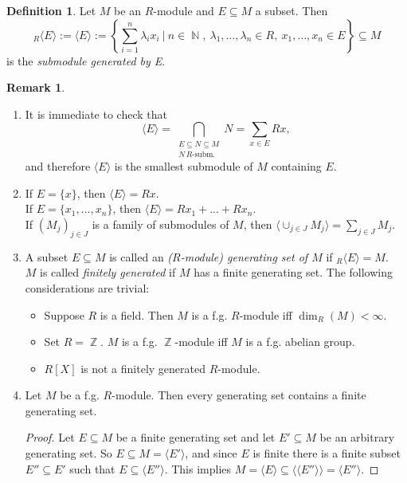 \documentclass[12pt,a4paper]{report}
\theoremstyle{definition}
\newtheorem{defn}[theorem]{Definition}
\newtheorem*{remark}{Remark}
\theoremstyle{num.custom-title}
\DeclareMathOperator{\N}{\mathbb{N}}
\DeclareMathOperator{\Z}{\mathbb{Z}}
\DeclareMathOperator{\sse}{\subseteq}
\begin{document}
\begin{defn}
Let $M$ be an $R$-module and $E \sse M$ a subset. Then 
\[
{}_R \langle E \rangle := \langle E \rangle := \left\{ \sum_{i=1}^n \lambda_i x_i \ \Bigg| \ n \in \N, \ \lambda_1, \ldots, \lambda_n \in R, \ x_1, \ldots, x_n \in E \right\} \sse M
\]
is the \emph{submodule generated by E}.
\end{defn}

\begin{remark}\ 
\begin{enumerate}
\item It is immediate to check that 
\[
\langle E \rangle = \bigcap_{\substack{E \sse N \sse M \\ N \, \text{$R$-subm.}}} N = \sum_{x \in E} Rx,
\]
and therefore $\langle E \rangle$ is the smallest submodule of $M$ containing $E$.
\item If $E = \{x\}$, then $\langle E \rangle = Rx$.\\ 
If $E = \{x_1,...,x_n\}$, then $\langle E \rangle = Rx_1 + ... + Rx_n$.\\
If $(M_j)_{j \in J}$ is a family of submodules of $M$, then $\langle \cup_{j \in J} M_j \rangle = \sum_{j \in J} M_j$.
\item A subset $E \sse M$ is called an \emph{($R$-module) generating set of $M$} if ${}_R \langle E \rangle = M$.\\
$M$ is called \emph{finitely generated} if $M$ has a finite generating set. The following considerations are trivial:
\begin{itemize}
\item Suppose $R$ is a field. Then $M$ is a f.g. $R$-module iff $\dim_R(M) < \infty$.
\item Set $R=\Z$. $M$ is a f.g. $\Z$-module iff $M$ is a f.g. abelian group.
\item $R[X]$ is not a finitely generated $R$-module.
\end{itemize}
\item Let $M$ be a f.g. $R$-module. Then every generating set contains a finite generating set.
\begin{proof}
Let $E \sse M$ be a finite generating set and let $E' \sse M$ be an arbitrary generating set. So $E \sse M = \langle E' \rangle$, and since $E$ is finite there is a finite subset $E'' \sse E'$ such that $E \sse \langle E'' \rangle$. This implies $M = \langle E \rangle \sse \langle \langle E'' \rangle \rangle = \langle E'' \rangle$.
\end{proof}
\end{enumerate}
\end{remark}
\end{document}
